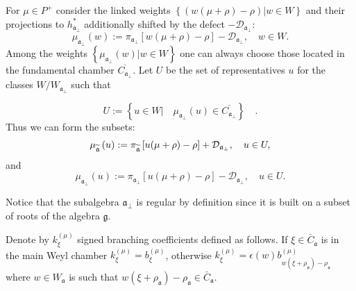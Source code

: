 \documentclass[preprint,12pt]{elsarticle}
\newcommand{\af}{\mathfrak{a}}
\newcommand{\afb}{\mathfrak{a}_{\bot}}
\begin{document}
For $\mu \in P^{+}$ consider the linked weights $\left\{ \left(
w(\mu +\rho )-\rho \right) |w\in W\right\} $ and their projections
to
$h_{\afb}^{\ast }$ additionally shifted by the defect $-%
\mathcal{D}_{\afb}$:
\begin{equation*}
\mu _{\afb}\left( w\right) :=\pi _{\afb}\left[
w(\mu +\rho )-\rho \right] -\mathcal{D}_{\afb},\quad w\in W.
\end{equation*}
Among the weights $\left\{ \mu _{\af_{\perp
}}\left( w\right) |w\in W\right\} $ one can always choose those located in
the fundamental chamber $\overline{C_{\afb}}$. Let $U$ be the
set of representatives $u$ for the classes $W/W_{\afb}$ such
that

\begin{equation}
U:=\left\{ u\in W|\quad \mu _{\afb}\left( u\right) \in
\overline{C_{\afb}}\right\} \quad .  \label{U-def}
\end{equation}
Thus we can form the subsets:
\begin{equation}
\mu _{\widetilde{\mathfrak{a}}}\left( u\right) :=\pi _{\widetilde{%
\mathfrak{a}}}\left[ u(\mu +\rho )-\rho \right] +\mathcal{D}_{\af%
_{\perp }},\quad u\in U,  \label{mu-a}
\end{equation}
and
\begin{equation}
\mu _{\afb}\left( u\right) :=\pi _{\afb}\left[
u(\mu +\rho )-\rho \right] -\mathcal{D}_{\afb},\quad u\in U.
\label{mu-a-tilda}
\end{equation}

Notice that the subalgebra $\mathfrak{a}_{\bot}$ is regular by definition
since it is built on a subset of roots of the algebra $\mathfrak{g}$.

Denote by  $k_{\xi }^{\left( \mu \right) }$ signed branching coefficients defined as follows. If $\xi\in \bar C_{\af}$ is in the main Weyl chamber $k_{\xi}^{(\mu)}=b^{(\mu)}_{\xi}$, otherwise $k_{\xi}^{(\mu)}=\epsilon(w) b^{(\mu)}_{w (\xi+\rho_{\af})-\rho_{\af}}$ where $w\in W_{\af}$ is such that $w (\xi+\rho_{\af})-\rho_{\af}\in \bar C_{\af}$. 
\end{document}
